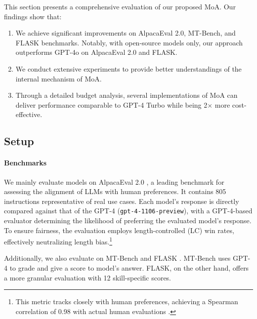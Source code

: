 \documentclass{article}
\begin{document}
This section presents a comprehensive evaluation of our proposed MoA. 
Our findings show that:
\begin{enumerate}
    \item We achieve significant improvements on AlpacaEval 2.0, MT-Bench, and FLASK benchmarks. 
        Notably, with open-source models only, our approach outperforms GPT-4o on AlpacaEval 2.0 and FLASK.
    \item We conduct extensive experiments to provide better understandings of the internal mechanism of MoA.
    \item Through a detailed budget analysis, several implementations of MoA can deliver performance comparable to GPT-4 Turbo while being 2$\times$ more cost-effective.
\end{enumerate}

\subsection{Setup}

\paragraph{Benchmarks} We mainly evaluate models on AlpacaEval 2.0 \citep{alpaca-eval},
a leading benchmark for assessing the alignment of LLMs with human preferences. 
It contains 805 instructions representative of real use cases. 
Each model's response is directly compared against that of the GPT-4 (\texttt{gpt-4-1106-preview}),
with a GPT-4-based evaluator determining the likelihood of preferring the evaluated model's response.
To ensure fairness, the evaluation employs length-controlled (LC) win rates, effectively neutralizing length bias.\footnote{
This metric tracks closely with human preferences, achieving a Spearman correlation of 0.98 with actual human evaluations \citep{alpaca-eval}.}

Additionally, we also evaluate on MT-Bench \citep{mt-bench} and FLASK \citep{flask}.
MT-Bench uses GPT-4 to grade and give a score to model's answer.
FLASK, on the other hand, offers a more granular evaluation with 12 skill-specific scores.
\end{document}
